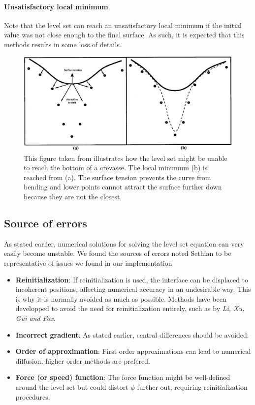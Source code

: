 \documentclass{article}
\begin{document}
\paragraph{Unsatisfactory local minimum}
\label{localmin}
Note that the level set can reach an unsatisfactory local minimum if the initial
value was not close enough to the final surface. As such, it is expected that
this methods results in some loss of details.

\begin{figure}[H]
  \centering
  \includegraphics[width=1.0\textwidth]{img/savadjiev3_3.png}
  \caption{This figure taken from \cite{savadjiev2003surface} illustrates
  how the level set might be unable to reach the bottom of a crevasse. The local
  minumum (b) is reached from (a). The surface tension prevents the curve from
  bending and lower points cannot attract the surface further down because they
  are not the closest.}    
\end{figure}

\subsection{Source of errors}
As stated earlier, numerical solutions for solving the level set equation can
very easily become unstable. We found the sources of errors noted Sethian
\cite{sethian2001evolution} to be representative of issues we found in our
implementation
\begin{itemize}
    \item \textbf{Reinitialization}: If reinitialization is used, the interface
        can be displaced to incoherent positions, affecting numerical accuracy
        in an undesirable way. This is why it is normally avoided as much as
        possible. Methods have been developped to avoid the need for
        reinitialization entirely, such as \cite{li2010distance} by \emph{Li,
        Xu, Gui and Fox}.
    \item \textbf{Incorrect gradient}: As stated earlier, central differences
        should be avoided.
    \item \textbf{Order of approximation}: First order approximations can lead
        to numerical diffusion, higher order methods are prefered.
    \item \textbf{Force (or speed) function}: The force function might be
        well-defined around the level set but could distort $\phi$
        further out, requiring reinitialization procedures. 
\end{itemize}
\end{document}
